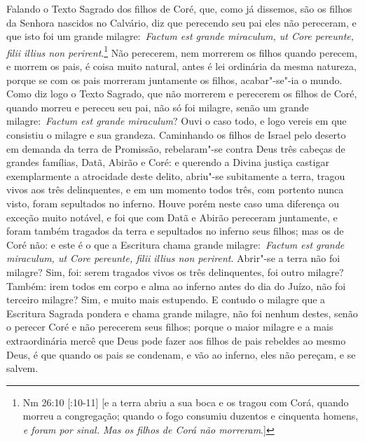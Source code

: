 Falando o Texto Sagrado dos filhos de Coré, que, como já
dissemos, são os filhos da Senhora nascidos no Calvário, diz que
perecendo seu pai eles não pereceram, e que isto foi um grande
milagre:~\emph{Factum est grande miraculum, ut Core pereunte, filii
illius non perirent}.\footnote{Nm 26:10 [:10-11] [e a terra abriu a sua boca e os tragou com Corá, quando morreu a congregação; quando o fogo consumiu duzentos e cinquenta homens, \textit{e foram por sinal. Mas os filhos de Corá
não morreram}.]} Não perecerem, nem morrerem os
filhos quando perecem, e morrem os pais, é coisa muito natural, antes é
lei ordinária da mesma natureza, porque se com os pais morreram
juntamente os filhos, acabar"-se"-ia o mundo. Como diz logo o Texto
Sagrado, que não morrerem e perecerem os filhos de Coré, quando morreu e
pereceu seu pai, não só foi milagre, senão um grande
milagre:~\emph{Factum est grande miraculum}? Ouvi o caso todo, e logo
vereis em que consistiu o milagre e sua grandeza. Caminhando os filhos
de Israel pelo deserto em demanda da terra de Promissão, rebelaram"-se
contra Deus três cabeças de grandes famílias, Datã, Abirão e Coré: e
querendo a Divina justiça castigar exemplarmente a atrocidade deste
delito, abriu"-se subitamente a terra, tragou vivos aos três
delinquentes, e em um momento todos três, com portento nunca visto,
foram sepultados no inferno. Houve porém neste caso uma diferença ou
exceção muito notável, e foi que com Datã e Abirão pereceram juntamente,
e foram também tragados da terra e sepultados no inferno seus filhos;
mas os de Coré não: e este é o que a Escritura chama grande
milagre:~\emph{Factum est grande miraculum, ut Core pereunte, filii
illius non perirent}. Abrir"-se a terra não foi milagre? Sim, foi: serem
tragados vivos os três delinquentes, foi outro milagre? Também: irem
todos em corpo e alma ao inferno antes do dia do Juízo, não foi terceiro
milagre? Sim, e muito mais estupendo. E contudo o milagre que a
Escritura Sagrada pondera e chama grande milagre, não foi nenhum destes,
senão o perecer Coré e não perecerem seus filhos; porque o maior milagre
e a mais extraordinária mercê que Deus pode fazer aos filhos de pais
rebeldes ao mesmo Deus, é que quando os pais se condenam, e vão ao
inferno, eles não pereçam, e se salvem.



